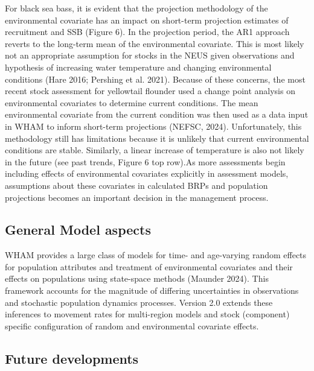 \documentclass[
]{article}
\begin{document}
For black sea bass, it is evident that the projection methodology of the
environmental covariate has an impact on short-term projection estimates
of recruitment and SSB (Figure 6). In the projection period, the AR1
approach reverts to the long-term mean of the environmental covariate.
This is most likely not an appropriate assumption for stocks in the NEUS
given observations and hypothesis of increasing water temperature and
changing environmental conditions (Hare 2016; Pershing et al. 2021).
Because of these concerns, the most recent stock assessment for
yellowtail flounder used a change point analysis on environmental
covariates to determine current conditions. The mean environmental
covariate from the current condition was then used as a data input in
WHAM to inform short-term projections (NEFSC, 2024). Unfortunately, this
methodology still has limitations because it is unlikely that current
environmental conditions are stable. Similarly, a linear increase of
temperature is also not likely in the future (see past trends, Figure 6
top row).As more assessments begin including effects of environmental
covariates explicitly in assessment models, assumptions about these
covariates in calculated BRPs and population projections becomes an
important decision in the management process.

\hypertarget{general-model-aspects}{%
\subsection*{General Model aspects}\label{general-model-aspects}}

WHAM provides a large class of models for time- and age-varying random
effects for population attributes and treatment of environmental
covariates and their effects on populations using state-space methods
(Maunder 2024). This framework accounts for the magnitude of differing
uncertainties in observations and stochastic population dynamics
processes. Version 2.0 extends these inferences to movement rates for
multi-region models and stock (component) specific configuration of
random and environmental covariate effects.

\hypertarget{future-developments}{%
\subsection*{Future developments}\label{future-developments}}
\end{document}

